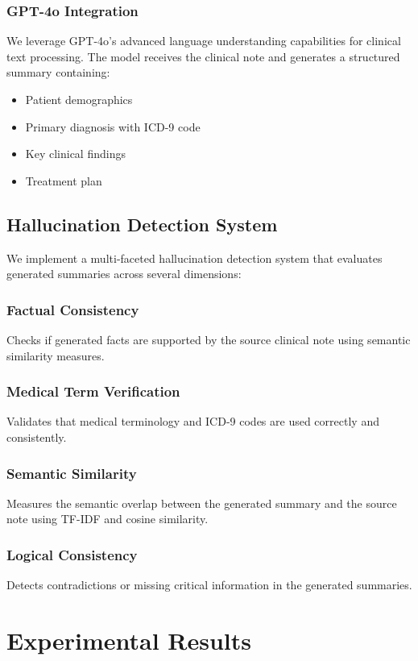 \documentclass[sigconf]{acmart}
\begin{document}
\subsubsection{GPT-4o Integration}
We leverage GPT-4o's advanced language understanding capabilities for clinical text processing. The model receives the clinical note and generates a structured summary containing:
\begin{itemize}
    \item Patient demographics
    \item Primary diagnosis with ICD-9 code
    \item Key clinical findings
    \item Treatment plan
\end{itemize}

\subsection{Hallucination Detection System}
We implement a multi-faceted hallucination detection system that evaluates generated summaries across several dimensions:

\subsubsection{Factual Consistency}
Checks if generated facts are supported by the source clinical note using semantic similarity measures.

\subsubsection{Medical Term Verification}
Validates that medical terminology and ICD-9 codes are used correctly and consistently.

\subsubsection{Semantic Similarity}
Measures the semantic overlap between the generated summary and the source note using TF-IDF and cosine similarity.

\subsubsection{Logical Consistency}
Detects contradictions or missing critical information in the generated summaries.

\section{Experimental Results}
\label{sec:results}
\end{document}
